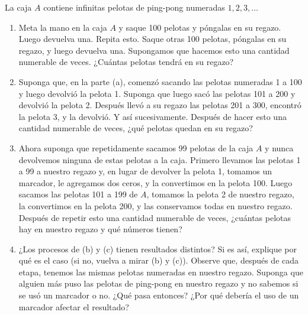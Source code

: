 \documentclass[12pt,a4paper]{book}
\begin{document}
    \begin{ejercicio}
        La caja $A$ contiene infinitas pelotas de ping-pong numeradas $1,2,3,\dots$
        \begin{enumerate}[label=(\alph*)]
            \item Meta la mano en la caja $A$ y saque 100 pelotas y póngalas en su regazo. Luego devuelva una. Repita
            esto. Saque otras 100 pelotas, póngalas en su regazo, y luego devuelva una. Supongamos que hacemos esto una
            cantidad numerable de veces. ¿Cuántas pelotas tendrá en su regazo?
            \item Suponga que, en la parte (a), comenzó sacando las pelotas numeradas 1 a 100 y luego devolvió la pelota 1.
            Suponga que luego sacó las pelotas 101 a 200 y devolvió la pelota 2. Después llevó a su regazo las pelotas
            201 a 300, encontró la pelota 3, y la devolvió. Y así sucesivamente. Después de hacer esto una cantidad
            numerable de veces, ¿qué pelotas quedan en su regazo?
            \item Ahora suponga que repetidamente sacamos 99 pelotas de la caja $A$ y nunca devolvemos ninguna de estas
            pelotas a la caja. Primero llevamos las pelotas 1 a 99 a nuestro regazo y, en lugar de devolver la pelota 1,
            tomamos un marcador, le agregamos dos ceros, y la convertimos en la pelota 100. Luego sacamos las pelotas 101
            a 199 de $A$, tomamos la pelota 2 de nuestro regazo, la convertimos en la pelota 200, y las conservamos todas
            en nuestro regazo. Después de repetir esto una cantidad numerable de veces, ¿cuántas pelotas hay en nuestro
            regazo y qué números tienen?
            \item ¿Los procesos de (b) y (c) tienen resultados distintos? Si es así, explique por qué es el caso (si no,
            vuelva a mirar (b) y (c)). Observe que, después de cada etapa, tenemos las mismas pelotas numeradas en nuestro
            regazo. Suponga que alguien más puso las pelotas de ping-pong en nuestro regazo y no sabemos si se usó un
            marcador o no. ¿Qué pasa entonces? ¿Por qué debería el uso de un marcador afectar el resultado?
        \end{enumerate}
    \end{ejercicio}
\end{document}
